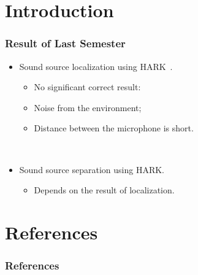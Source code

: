 \documentclass{beamer}
\title{\trtitle}
\author{\trauthor}
\begin{document}
\frame{\titlepage}


\section{Introduction}
\begin{frame}
  \frametitle{Result of Last Semester}
  
  \begin{itemize}
    \item Sound source localization using HARK~\cite{rabiner_fundamentals_1993}.
      \begin{itemize}
        \item No significant correct result:
        \item Noise from the environment;
        \item Distance between the microphone is short.
      \end{itemize}
    ~

    \item Sound source separation using HARK.
      \begin{itemize}
        \item Depends on the result of localization.
      \end{itemize}
  \end{itemize}
\end{frame}


\section*{References}
\begin{frame}[allowframebreaks]
  \frametitle{References}
  {\footnotesize
  
    
  }
\end{frame}
\end{document}
